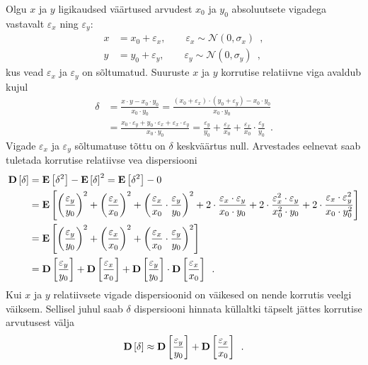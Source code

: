 Olgu $x$ ja $y$ ligikaudsed väärtused arvudest $x_0$ ja $y_0$ absoluutsete vigadega vastavalt $\varepsilon_x$ ning $\varepsilon_y$:
\begin{align*}
    x&=x_0+\varepsilon_x ,\qquad \varepsilon_x\sim\mathcal{N}(0, \sigma_x) \enspace,\\
    y&=y_0+\varepsilon_y ,\qquad \varepsilon_y\sim\mathcal{N}(0, \sigma_y) \enspace,
\end{align*}
kus vead $\varepsilon_x$ ja $\varepsilon_y$ on sõltumatud. Suuruste $x$ ja $y$ korrutise relatiivne viga avaldub kujul
\begin{align*}
    \delta&=\frac{x\cdot y-x_0\cdot y_0}{x_0\cdot y_0}=\frac{(x_0+\varepsilon_x)\cdot(y_0+\varepsilon_y)-x_0\cdot y_0}{x_0\cdot y_0} \\
    &=\frac{x_0\cdot\varepsilon_y+y_0\cdot\varepsilon_x+\varepsilon_x\cdot\varepsilon_y}{x_0\cdot y_0}=\frac{\varepsilon_y}{y_0}+\frac{\varepsilon_x}{x_0}+\frac{\varepsilon_x}{x_0}\cdot\frac{\varepsilon_y}{y_0} \enspace.
\end{align*}
Vigade $\varepsilon_x$ ja $\varepsilon_y$ sõltumatuse tõttu on $\delta$ keskväärtus null. Arvestades eelnevat saab tuletada korrutise relatiivse vea dispersiooni
\begin{align*}
    \operatorname*{\mathbf{D}}\left[\delta\right]&=\operatorname*{\mathbf{E}}\left[\delta^2\right]-\operatorname*{\mathbf{E}}\left[\delta\right]^2=\operatorname*{\mathbf{E}}\left[\delta^2\right]-0 \\
    &=\operatorname*{\mathbf{E}}\left[\left(\frac{\varepsilon_y}{y_0}\right)^2 + \left(\frac{\varepsilon_x}{x_0}\right)^2 + \left(\frac{\varepsilon_x}{x_0}\cdot\frac{\varepsilon_y}{y_0}\right)^2 + 2\cdot\frac{\varepsilon_x\cdot\varepsilon_y}{x_0\cdot y_0} + 2\cdot\frac{\varepsilon_x^2\cdot\varepsilon_y}{x_0^2\cdot y_0} + 2\cdot\frac{\varepsilon_x\cdot\varepsilon_y^2}{x_0\cdot y_0^2}\right] \\
    &=\operatorname*{\mathbf{E}}\left[\left(\frac{\varepsilon_y}{y_0}\right)^2+\left(\frac{\varepsilon_x}{x_0}\right)^2+\left(\frac{\varepsilon_x}{x_0}\cdot\frac{\varepsilon_y}{y_0}\right)^2\right] \\
    &=\operatorname*{\mathbf{D}}\left[\frac{\varepsilon_y}{y_0}\right]+\operatorname*{\mathbf{D}}\left[\frac{\varepsilon_x}{x_0}\right] +\operatorname*{\mathbf{D}}\left[\frac{\varepsilon_y}{y_0}\right]\cdot\operatorname*{\mathbf{D}}\left[\frac{\varepsilon_x}{x_0}\right] \enspace.
\end{align*}
Kui $x$ ja $y$ relatiivsete vigade dispersioonid on väikesed on nende korrutis veelgi väiksem. Sellisel juhul saab $\delta$ dispersiooni hinnata küllaltki täpselt jättes korrutise arvutusest välja
\begin{equation}
    \label{eq:korrutise relatiivne viga dispersioon ligikaudne}
    \operatorname*{\mathbf{D}}\left[\delta\right]\approx\operatorname*{\mathbf{D}}\left[\frac{\varepsilon_y}{y_0}\right]+\operatorname*{\mathbf{D}}\left[\frac{\varepsilon_x}{x_0}\right] \enspace.
\end{equation}

